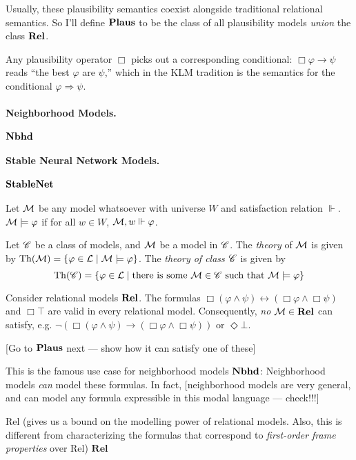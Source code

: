 \documentclass[letterpaper]{article}
\begin{document}
Usually, these plausibility semantics coexist alongside traditional relational semantics.  So I'll define $\textrm{\textbf{Plaus}}$ to be the class of all plausibility models \emph{union} the class $\textrm{\textbf{Rel}}$.

Any plausibility operator $\Box$ picks out a corresponding conditional: $\Box \varphi \to \psi$ reads ``the best $\varphi$ are $\psi$,'' which in the KLM tradition is the semantics for the conditional $\varphi \Rightarrow \psi$.

\paragraph*{Neighborhood Models.} $\textrm{\textbf{Nbhd}}$

\paragraph*{Stable Neural Network Models.} $\textrm{\textbf{StableNet}}$

\paragraph*{}

\begin{definition}
    Let $\mathcal{M}$ be any model whatsoever with universe $W$ and satisfaction relation $\Vdash$.  $\mathcal{M} \models \varphi$ if for all $w \in W$, $\mathcal{M}, w \Vdash \varphi$.
\end{definition}

\begin{definition}
    Let $\mathscr{C}$ be a class of models, and $\mathcal{M}$ be a model in $\mathscr{C}$.  The \emph{theory} of $\mathcal{M}$ is given by $\mathrm{Th}( \mathcal{M} ) = \{ \varphi \in \mathcal{L} \mid \mathcal{M} \models \varphi \}$.  The \emph{theory of class $\mathscr{C}$} is given by 
    \[
        \mathrm{Th}( \mathscr{C} ) = \{ \varphi \in \mathcal{L} \mid \textrm{there is some } \mathcal{M} \in \mathscr{C} \textrm{ such that } \mathcal{M} \models \varphi \}
    \]
\end{definition}

\begin{example}
    Consider relational models $\textrm{\textbf{Rel}}$.  The formulas $\Box(\varphi \land \psi) \leftrightarrow (\Box \varphi \land \Box \psi)$ and $\Box \top$ are valid in every relational model.  Consequently, \emph{no} $\mathcal{M} \in \textrm{\textbf{Rel}}$ can satisfy, e.g. $\neg (\Box(\varphi \land \psi) \to (\Box \varphi \land \Box \psi))$ or $\Diamond \bot$.

    [Go to $\textrm{\textbf{Plaus}}$ next --- show how it can satisfy one of these]

    This is the famous use case for neighborhood models $\textrm{\textbf{Nbhd}}$: Neighborhood models \emph{can} model these formulas.  In fact, [neighborhood models are very general, and can model any formula expressible in this modal language --- check!!!]
    
    Rel (gives us a bound on the modelling power of relational models.  Also, this is different from characterizing the formulas that correspond to \emph{first-order frame properties} over Rel)
    $\textbf{Rel}$
\end{example}
\end{document}
